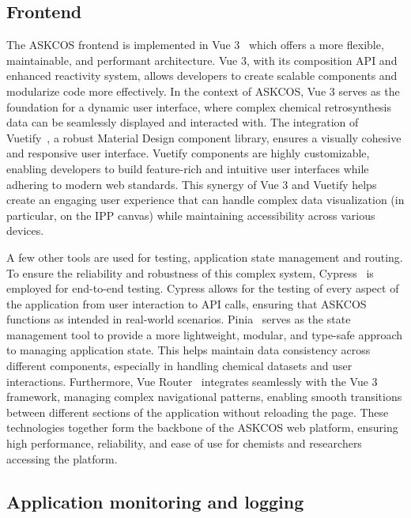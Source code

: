 \documentclass[pdflatex,sn-mathphys-num]{sn-jnl}%
\theoremstyle{thmstyleone}%
\theoremstyle{thmstyletwo}%
\theoremstyle{thmstylethree}%
\begin{document}
\subsection{Frontend}


The ASKCOS frontend is implemented in Vue 3~\citep{Vue} which offers a more flexible, maintainable, and performant architecture. Vue 3, with its composition API and enhanced reactivity system, allows developers to create scalable components and modularize code more effectively. In the context of ASKCOS, Vue 3 serves as the foundation for a dynamic user interface, where complex chemical retrosynthesis data can be seamlessly displayed and interacted with. The integration of Vuetify~\citep{Vuetify}, a robust Material Design component library, ensures a visually cohesive and responsive user interface. Vuetify components are highly customizable, enabling developers to build feature-rich and intuitive user interfaces while adhering to modern web standards. This synergy of Vue 3 and Vuetify helps create an engaging user experience that can handle complex data visualization (in particular, on the IPP canvas) while maintaining accessibility across various devices.

A few other tools are used for testing, application state management and routing. To ensure the reliability and robustness of this complex system, Cypress~\citep{Cypress} is employed for end-to-end testing. Cypress allows for the testing of every aspect of the application from user interaction to API calls, ensuring that ASKCOS functions as intended in real-world scenarios. Pinia~\citep{Pinia} serves as the state management tool to provide a more lightweight, modular, and type-safe approach to managing application state. This helps maintain data consistency across different components, especially in handling chemical datasets and user interactions. Furthermore, Vue Router~\citep{VueRouter} integrates seamlessly with the Vue 3 framework, managing complex navigational patterns, enabling smooth transitions between different sections of the application without reloading the page. These technologies together form the backbone of the ASKCOS web platform, ensuring high performance, reliability, and ease of use for chemists and researchers accessing the platform.

\subsection{Application monitoring and logging}
\end{document}
